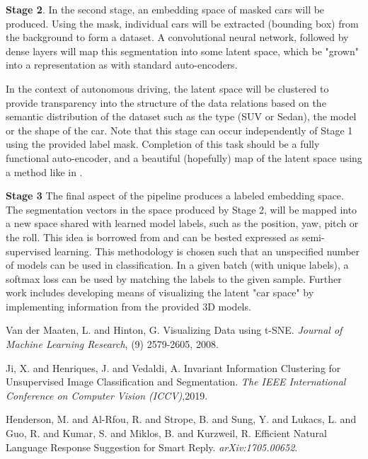 \documentclass[twocolumn]{article}
\begin{document}
  \textbf{Stage 2}. In the second stage, an embedding space of masked cars will
be produced. Using the mask, individual cars will be extracted (bounding box)
from the background to form a dataset. A convolutional neural network, followed
by dense layers will map this segmentation into some latent space, which
be "grown" into a representation as with standard auto-encoders.

  In the context of autonomous driving, the latent space will be clustered to
provide transparency into the structure of the data relations based on the
semantic distribution of the dataset such as the type (SUV or Sedan), the model
or the shape of the car. Note that this stage can occur independently of Stage 1
using the provided label mask. Completion of this task should be a fully
functional auto-encoder, and a beautiful (hopefully) map of the latent space
using a method like in \cite{Maaten2008}.

  \textbf{Stage 3} The final aspect of the pipeline produces a labeled
embedding space. The segmentation vectors in the space produced by Stage 2,
will be mapped into a new space shared with learned model labels, such as the
position, yaw, pitch or the roll. This idea is borrowed from
\cite{Henderson2017} and can be bested expressed as semi-supervised learning.
This methodology is chosen such that an unspecified number of models can be
used in classification. In a given batch (with unique labels), a softmax loss
can be used by matching the labels to the given sample. Further work includes
developing means of visualizing the latent "car space" by implementing
information from the provided 3D models.

\begin{thebibliography}{8}  Van der Maaten, L. and Hinton,
G. Visualizing Data using t-SNE. \textit{Journal of Machine Learning Research},
(9) 2579-2605, 2008.

   Ji, X. and Henriques, J. and Vedaldi, A. Invariant
Information Clustering for Unsupervised Image Classification and Segmentation.
\textit{The IEEE International Conference on Computer Vision (ICCV)},2019.

   Henderson, M. and Al-Rfou, R. and Strope, B. and
Sung, Y. and Lukacs, L. and Guo, R. and Kumar, S. and Miklos, B. and Kurzweil,
R.  Efficient Natural Language Response Suggestion for Smart Reply.
\textit{arXiv:1705.00652}.

\end{thebibliography}
\end{document}
